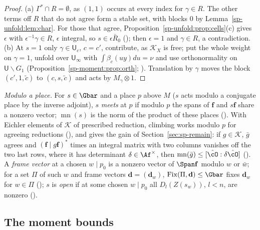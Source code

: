 \begin{proof}
(a) $\Gamma^*\cap R=\emptyset$, as $(1,1)$ occurs at every index for $\gamma\in R$. The other terms
off $R$ that do not agree form a stable set, with blocks $0$ by Lemma~\ref{sp-unfold:lem:char}. For
those that agree, Proposition~\ref{sp-unfold:prop:cells}(c) gives $\epsilon$ with $\epsilon^{-1}\gamma\in R$,
$\epsilon$ integral, so $s\in\epsilon\bar R_0$ (); then
$\epsilon=1$ and $\gamma\in R$, a contradiction. (b) At $s=1$ only $\gamma\in\mathsf U_c$, $c=c'$,
contribute, as $\mathcal K_X$ is free; put the whole weight on $\gamma=1$, unfold over $\mathsf U_\infty$
with $\int\beta_c(uy)du=\nu$ and use orthonormality on $\mathsf U\backslash G_1$
(Proposition~\ref{sp-moment:prop:orth}; ).
Translation by $\gamma$ moves the block $(c',1,\tilde c)$ to $(c,s,\tilde c)$ and acts by $M_\gamma\otimes1$.
\end{proof}

\emph{Modulo a place.} For $s\in\Gbar$ and a place $p$ above $M$ ($s$ acts modulo a conjugate place
by the inverse adjoint), $s$ \emph{meets} at $p$ if modulo $p$ the spans of $\mathbf f$ and
$s\mathbf f$ share a nonzero vector; $\operatorname{mn}(s)$ is the norm of the product of these
places (). With Eichler elements of $\mathcal K$ of prescribed reduction, climbing
works modulo $p$ for agreeing reductions (),
and gives the gain of Section~\ref{sec:sp-remain}: if $g\in\mathcal K$, $\bar g$ agrees and $(\mathbf
f\mid g\mathbf f)^*$ times an integral matrix with two columns vanishes off the two last rows, where
it has determinant $\delta\in\Af^\times$, then $\operatorname{mn}(\bar g)\le[\hat\cO:\delta\hat\cO]$
(). A \emph{frame vector} at a chosen $w\mid p_0$ is a
nonzero vector of $\Span\mathbf f$ modulo $w$ or $\bar w$; for a set $\Pi$ of such $w$ and frame
vectors $\mathbf d=(\mathbf d_w)$, $\operatorname{Fix}(\Pi,\mathbf d)\le\Gbar$ fixes $\mathbf d_w$ for $w\in\Pi$
(); $s$ is \emph{open} if at some chosen $w\mid p_0$ all $D_l(Z(s_w))$, $l<n$,
are nonzero ().

\subsection{The moment bounds}\label{sp-unfold:ss:moments}

